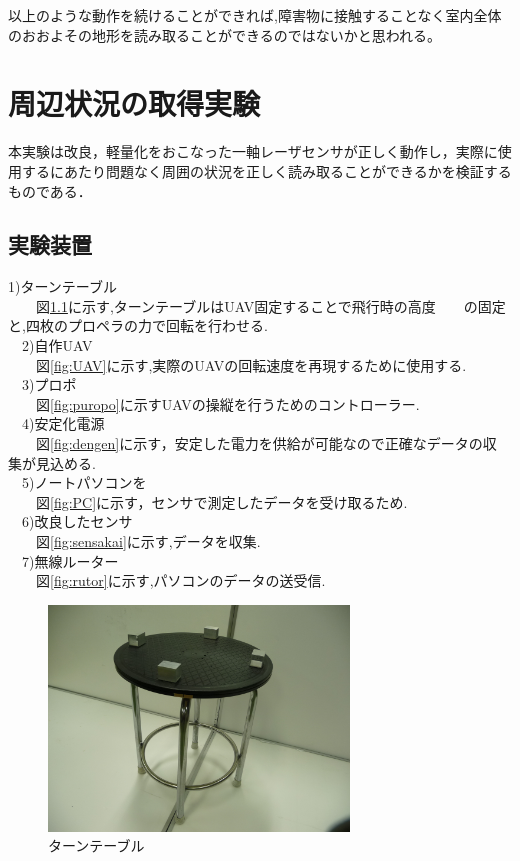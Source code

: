 \documentclass[12pt,oneside]{sotsuken_paper}
\begin{document}
以上のような動作を続けることができれば,障害物に接触することなく室内全体のおおよその地形を読み取ることができるのではないかと思われる。

\chapter{周辺状況の取得実験}本実験は改良，軽量化をおこなった一軸レーザセンサが正しく動作し，実際に使用するにあたり問題なく周囲の状況を正しく読み取ることができるかを検証するものである．

\section{実験装置}
 1)ターンテーブル\\
　　図\ref{fig:te-buru}に示す,ターンテーブルはUAV固定することで飛行時の高度　　の固定と,四枚のプロペラの力で回転を行わせる.\\
  　2)自作UAV\\
　　図\ref{fig:UAV}に示す,実際のUAVの回転速度を再現するために使用する.\\
  　3)プロポ\\
　　図\ref{fig:puropo}に示すUAVの操縦を行うためのコントローラー.\\
  　4)安定化電源\\
　　図\ref{fig:dengen}に示す，安定した電力を供給が可能なので正確なデータの収　　集が見込める.\\
  　5)ノートパソコンを\\
　　図\ref{fig:PC}に示す，センサで測定したデータを受け取るため.\\
  　6)改良したセンサ\\
　　図\ref{fig:sensakai}に示す,データを収集.\\
  　7)無線ルーター\\
　　図\ref{fig:rutor}に示す,パソコンのデータの送受信.\\


\begin{figure}[H]
\begin{center}
\includegraphics[width=80mm]{img/te-buru.jpg}
\end{center}
\caption{ターンテーブル}
\label{fig:te-buru}
\end{figure}
\end{document}
